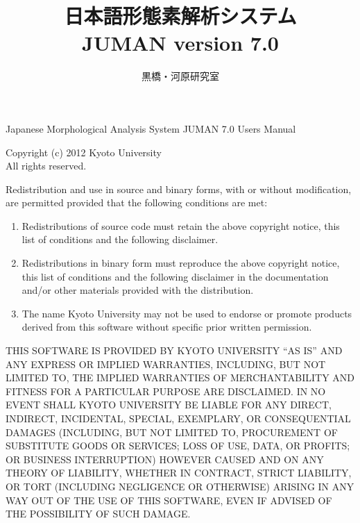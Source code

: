 \documentclass[a4j,titlepage]{jarticle}
\title{\bf 日本語形態素解析システム \\ JUMAN version 7.0}
\author{黒橋・河原研究室}
\date{平成24年1月 \\
\rule{0mm}{110mm}Copyright \copyright\ 2012\begin{tabular}[t]{l}
                                京都大学大学院情報学研究科 \\
                                \end{tabular}
}
\begin{document}
\maketitle

\thispagestyle{empty}

\vspace*{\fill}

\begin{small}
\noindent
Japanese Morphological Analysis System JUMAN 7.0 Users Manual

\noindent
Copyright (c) 2012 Kyoto University \\
All rights reserved.

\noindent
Redistribution and use in source and binary forms, with or without
modification, are permitted provided that the following conditions
are met:

\begin{enumerate}
 \item Redistributions of source code must retain the above copyright
   notice, this list of conditions and the following disclaimer.
 \item Redistributions in binary form must reproduce the above copyright
   notice, this list of conditions and the following disclaimer in the
   documentation and/or other materials provided with the distribution.
 \item The name Kyoto University may not be used to endorse or promote
   products derived from this software without specific prior written
   permission.
\end{enumerate}

\noindent
THIS SOFTWARE IS PROVIDED BY KYOTO UNIVERSITY ``AS IS'' AND ANY
EXPRESS OR IMPLIED WARRANTIES, INCLUDING, BUT NOT LIMITED TO, THE
IMPLIED WARRANTIES OF MERCHANTABILITY AND FITNESS FOR A PARTICULAR
PURPOSE ARE DISCLAIMED.  IN NO EVENT SHALL KYOTO UNIVERSITY BE
LIABLE FOR ANY DIRECT, INDIRECT, INCIDENTAL, SPECIAL, EXEMPLARY, OR
CONSEQUENTIAL DAMAGES (INCLUDING, BUT NOT LIMITED TO, PROCUREMENT OF
SUBSTITUTE GOODS OR SERVICES; LOSS OF USE, DATA, OR PROFITS; OR BUSINESS
INTERRUPTION) HOWEVER CAUSED AND ON ANY THEORY OF LIABILITY, WHETHER IN
CONTRACT, STRICT LIABILITY, OR TORT (INCLUDING NEGLIGENCE OR OTHERWISE)
ARISING IN ANY WAY OUT OF THE USE OF THIS SOFTWARE, EVEN IF ADVISED OF
THE POSSIBILITY OF SUCH DAMAGE.


\vspace{1cm}


\end{small}
\end{document}
